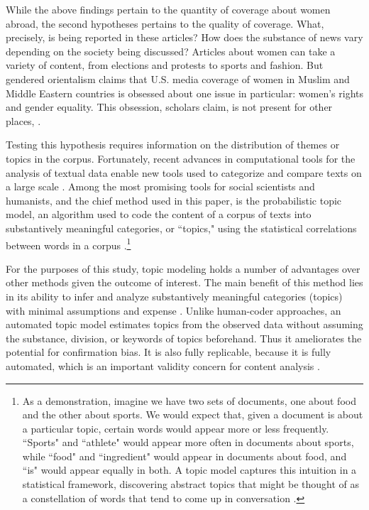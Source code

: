 \documentclass[11pt, oneside]{article}
\begin{document}
While the above findings pertain to the quantity of coverage about women abroad, the second hypotheses pertains to the quality of coverage. What, precisely, is being reported in these articles? How does the substance of news vary depending on the society being discussed? Articles about women can take a variety of content, from elections and protests to sports and fashion. But gendered orientalism claims that U.S. media coverage of women in Muslim and Middle Eastern countries is obsessed about one issue in particular: women's rights and gender equality. This obsession, scholars claim, is not present for other places, . 

Testing this hypothesis requires information on the distribution of themes or topics in the corpus. Fortunately, recent advances in computational tools for the analysis of textual data enable new tools used to categorize and compare texts on a large scale \cite{grimmer2013}. Among the most promising tools for social scientists and humanists, and the chief method used in this paper, is the probabilistic topic model, an algorithm used to code the content of a corpus of texts into substantively meaningful categories, or ``topics," using the statistical correlations between words in a corpus \cite{mohr2013}.\footnote{\hspace{5}As a demonstration, imagine we have two sets of documents, one about food and the other about sports. We would expect that, given a document is about a particular topic, certain words would appear more or less frequently. ``Sports" and ``athlete" would appear more often in documents about sports, while ``food" and ``ingredient" would appear in documents about food, and ``is" would appear equally in both. A topic model captures this intuition in a statistical framework, discovering abstract topics that might be thought of as a constellation of words that tend to come up in conversation \cite{mohr2013}.}

For the purposes of this study, topic modeling holds a number of advantages over other methods given the outcome of interest. The main benefit of this method lies in its ability to infer and analyze substantively meaningful categories (topics) with minimal assumptions and expense \cite{quinn2010}. Unlike human-coder approaches, an automated topic model estimates topics from the observed data without assuming the substance, division, or keywords of topics beforehand. Thus it ameliorates the potential for confirmation bias. It is also fully replicable, because it is fully automated, which is an important validity concern for content analysis \cite{neuendorf2011}.
\end{document}
